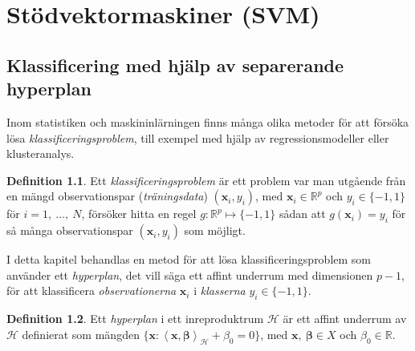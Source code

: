 \documentclass[a4paper, 12pt]{report}
\theoremstyle{definition}
\newtheorem{defi}{Definition}[section]
\theoremstyle{remark}
\newcommand{\bfbeta}{{\boldsymbol{\beta}}}
\newcommand{\bfx}{\mathbf{x}}
\newcommand{\llangle}{\left\langle}
\newcommand{\rrangle}{\right\rangle}
\newcommand{\inner}[2]{\llangle #1, #2 \rrangle}
\newcommand{\hil}{\mathcal{H}}
\begin{document}

\chapter{Stödvektormaskiner (SVM)}



\section{Klassificering med hjälp av separerande hyperplan}

Inom statistiken och maskininlärningen finns många olika metoder för att försöka lösa \emph{klassificeringsproblem}, till exempel med hjälp av regressionsmodeller eller klusteranalys.

\begin{defi}
	Ett \textit{klassificeringsproblem} är ett problem var man utgående från en mängd observationspar (\textit{träningsdata}) $\left(\mathbf{x}_i, y_i\right)$, med $\mathbf{x}_i\in\mathbb{R}^p$ och $y_i\in\{-1, 1\}$ för $i=1,~\dots,~N$, försöker hitta en regel $g: \mathbb{R}^p \longmapsto \{-1, 1\}$ sådan att $g\left(\mathbf{x}_i\right)=y_i$ för så många observationspar $\left(\mathbf{x}_i, y_i\right)$ som möjligt.
\end{defi}

 I detta kapitel behandlas en metod för att lösa klassificeringsproblem som använder ett \emph{hyperplan}, det vill säga ett affint underrum med dimensionen $p-1$, för att klassificera \textit{observationerna} $\mathbf{x}_i$ i \textit{klasserna} $y_i\in\{-1, 1\}$.

\begin{defi}
	Ett \textit{hyperplan} i ett inreproduktrum $\mathcal{H}$ är ett affint underrum av $\mathcal{H}$ definierat som mängden $\{\mathbf{x}: \inner{\bfx}{\bfbeta}_\mathcal{H} + \beta_0=0\}$, med $\mathbf{x},~\bfbeta\in X$ och $\beta_0\in\mathbb{R}$.
\end{defi}
\end{document}
